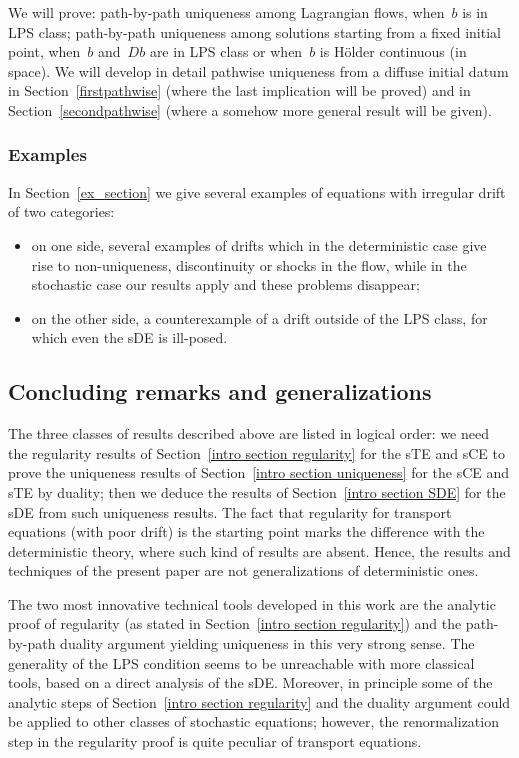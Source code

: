 \documentclass[a4paper,10pt]{article}
\newcommand\1{\mathbbm{1}}
\numberwithin{equation}{section}
\begin{document}
We will prove: path-by-path uniqueness among Lagrangian flows, when~$b$ is in LPS class; path-by-path uniqueness among solutions starting from a fixed initial point, when~$b$ and~$Db$ are in LPS class or when~$b$ is H\"older continuous (in space). We will develop in detail pathwise uniqueness from a diffuse initial datum in Section~\ref{firstpathwise} (where the last implication will be proved) and in Section~\ref{secondpathwise} (where a somehow more general result will be given).

\subsubsection{Examples}

In Section~\ref{ex_section} we give several examples of equations with irregular drift of two categories:
\begin{itemize}
\item[i)] on one side, several examples of drifts which in the deterministic case give rise to non-uniqueness, discontinuity or shocks in the flow, while in the stochastic case our results apply and these problems disappear;
\item[ii)] on the other side, a counterexample of a drift outside of the LPS class, for which even the sDE is ill-posed.
\end{itemize}

\subsection{Concluding remarks and generalizations}\label{general}

The three classes of results described above are listed in logical order: we need the regularity results of Section~\ref{intro section regularity} for the sTE and sCE to prove the uniqueness results of Section~\ref{intro section uniqueness} for the sCE and sTE by duality; then we deduce the results of Section~\ref{intro section SDE} for the sDE from such uniqueness results. The fact that regularity for transport equations (with poor drift) is the starting point marks the difference with the deterministic theory, where such kind of results are absent. Hence, the results and techniques of the present paper are not generalizations of deterministic ones.

The two most innovative technical tools developed in this work are the analytic proof of regularity (as stated in Section~\ref{intro section regularity}) and the path-by-path duality argument yielding uniqueness in this very strong sense. The generality of the LPS condition seems to be unreachable with more classical tools, based on a direct analysis of the sDE. Moreover, in principle some of the analytic steps of Section~\ref{intro section regularity} and the duality argument could be applied to other classes of stochastic equations; however, the renormalization step in the regularity proof is quite peculiar of transport equations.
\end{document}
